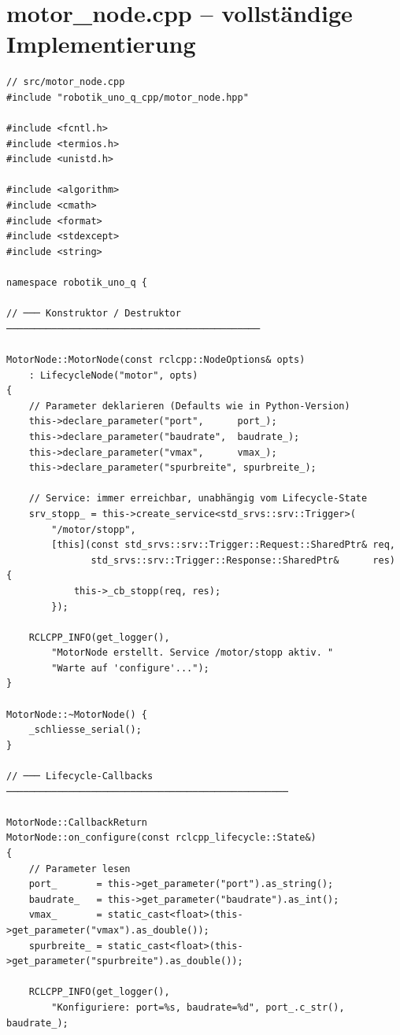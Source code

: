\section{motor\_node.cpp -- vollständige Implementierung}

\begin{lstlisting}[style=cpp]
// src/motor_node.cpp
#include "robotik_uno_q_cpp/motor_node.hpp"

#include <fcntl.h>
#include <termios.h>
#include <unistd.h>

#include <algorithm>
#include <cmath>
#include <format>
#include <stdexcept>
#include <string>

namespace robotik_uno_q {

// ─── Konstruktor / Destruktor ─────────────────────────────────────────────

MotorNode::MotorNode(const rclcpp::NodeOptions& opts)
    : LifecycleNode("motor", opts)
{
    // Parameter deklarieren (Defaults wie in Python-Version)
    this->declare_parameter("port",      port_);
    this->declare_parameter("baudrate",  baudrate_);
    this->declare_parameter("vmax",      vmax_);
    this->declare_parameter("spurbreite", spurbreite_);

    // Service: immer erreichbar, unabhängig vom Lifecycle-State
    srv_stopp_ = this->create_service<std_srvs::srv::Trigger>(
        "/motor/stopp",
        [this](const std_srvs::srv::Trigger::Request::SharedPtr& req,
               std_srvs::srv::Trigger::Response::SharedPtr&      res) {
            this->_cb_stopp(req, res);
        });

    RCLCPP_INFO(get_logger(),
        "MotorNode erstellt. Service /motor/stopp aktiv. "
        "Warte auf 'configure'...");
}

MotorNode::~MotorNode() {
    _schliesse_serial();
}

// ─── Lifecycle-Callbacks ──────────────────────────────────────────────────

MotorNode::CallbackReturn
MotorNode::on_configure(const rclcpp_lifecycle::State&)
{
    // Parameter lesen
    port_       = this->get_parameter("port").as_string();
    baudrate_   = this->get_parameter("baudrate").as_int();
    vmax_       = static_cast<float>(this->get_parameter("vmax").as_double());
    spurbreite_ = static_cast<float>(this->get_parameter("spurbreite").as_double());

    RCLCPP_INFO(get_logger(),
        "Konfiguriere: port=%s, baudrate=%d", port_.c_str(), baudrate_);


\end{lstlisting}
